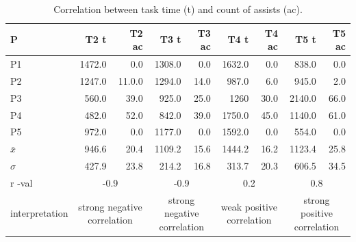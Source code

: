 \begin{landscape}
\begin{table}[]
\label{}
\caption{Correlation between task time (t) and count of assists (ac). }
\begin{tabular}{lrrrrrrrr}
\hline \hline
P              & T2 t & T2 ac & T3 t & T3 ac & T4 t & T4 ac & T5 t & T5 ac \\ \hline \hline 
P1             & 1472.0                      & 0.0                          & 1308.0                      & 0.0                          & 1632.0                      & 0.0                          & 838.0                       & 0.0                          \\ \hline
P2             & 1247.0                      & 11.0.0                         & 1294.0                      & 14.0                         & 987.0                       & 6.0                          & 945.0                       & 2.0                          \\ \hline
P3             & 560.0                       & 39.0                         & 925.0                       & 25.0                         & 1260                      & 30.0                         & 2140.0                      & 66.0                         \\ \hline
P4             & 482.0                       & 52.0                         & 842.0                       & 39.0                         & 1750.0                      & 45.0                         & 1140.0                      & 61.0                         \\ \hline
P5             & 972.0                       & 0.0                          & 1177.0                      & 0.0                          & 1592.0                      & 0.0                          & 554.0                       & 0.0                          \\ \hline
$\bar{x}$             & 946.6                     & 20.4                       & 1109.2                    & 15.6                       & 1444.2                    & 16.2                       & 1123.4                    & 25.8                       \\ \hline
$\sigma$              & 427.9                     & 23.8                       & 214.2                     & 16.8                       & 313.7                     & 20.3                       & 606.5                     & 34.5                       \\ \hline
r -val         & \multicolumn{2}{c}{-0.9}                              & \multicolumn{2}{c}{-0.9}                              & \multicolumn{2}{c}{0.2}                               & \multicolumn{2}{c}{0.8}                               \\ \hline
interpretation & \multicolumn{2}{c}{strong negative correlation}       & \multicolumn{2}{c}{strong negative correlation}       & \multicolumn{2}{c}{weak positive correlation}         & \multicolumn{2}{c}{strong positive correlation}       \\ \hline \hline
\end{tabular}
\end{table}
\end{landscape}